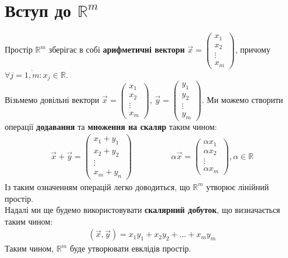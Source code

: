 \documentclass[a4paper, 10pt]{article}
\theoremstyle{theoremdd}
\theoremstyle{theoremdd}
\theoremstyle{theoremdd}
\theoremstyle{theoremdd}
\theoremstyle{theoremdd}
\theoremstyle{theoremdd}
\theoremstyle{theoremdd}
\theoremstyle{theoremdd}
\theoremstyle{theoremdd}
\begin{document}
\section{Вступ до $\mathbb{R}^m$}
Простір $\mathbb{R}^m$ зберігає в собі \textbf{арифметичні вектори} $\vec{x} = \begin{pmatrix}
x_1 \\ x_2 \\ \vdots \\ x_m
\end{pmatrix}$, причому $\forall j = \overline{1,m}: x_j \in \mathbb{R}$. \\
Візьмемо довільні вектори $\vec{x} = \begin{pmatrix}
x_1 \\ x_2 \\ \vdots \\ x_m
\end{pmatrix}$, $\vec{y} = \begin{pmatrix}
y_1 \\ y_2 \\ \vdots \\ y_m
\end{pmatrix}$. Ми можемо створити операції \textbf{додавання} та \textbf{множення на скаляр} таким чином:
\begin{align*}
\vec{x} + \vec{y} = \begin{pmatrix}
x_1 + y_1 \\ x_2 + y_2 \\ \vdots \\ x_m + y_n
\end{pmatrix} \hspace{2cm} \alpha \vec{x} = \begin{pmatrix}
\alpha x_1 \\ \alpha x_2 \\ \vdots \\ \alpha x_m
\end{pmatrix}, \alpha \in \mathbb{R}
\end{align*}
Із таким означенням операцій легко доводиться, що $\mathbb{R}^m$ утворює лінійний простір.\\
Надалі ми ще будемо використовувати \textbf{скалярний добуток}, що визначається таким чином:
\begin{align*}
(\vec{x}, \vec{y}) = x_1 y_1 + x_2 y_2 + \dots + x_m y_m
\end{align*}
Таким чином, $\mathbb{R}^m$ буде утворювати евклідів простір.
\end{document}
